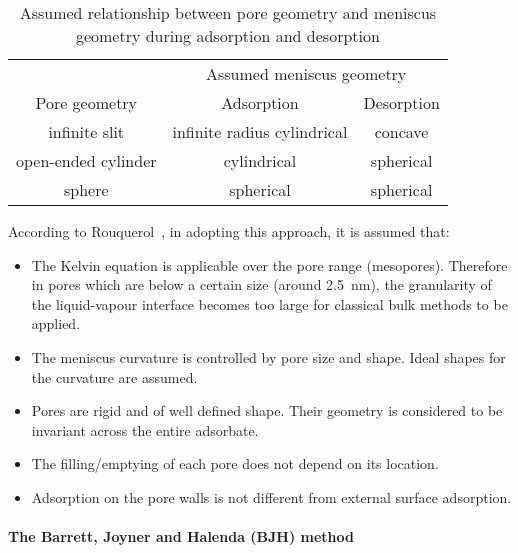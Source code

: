 \begin{table}[htb]
	\centering
	\caption{Assumed relationship between pore geometry and meniscus geometry during adsorption and desorption}%
	\label{pyg:tbl:kelvin-meniscus}
	\begin{tabular}{ccc}
		\toprule
		                    & \multicolumn{2}{c}{Assumed meniscus geometry}              \\
		\cmidrule{2-3}
		Pore geometry       & Adsorption                                    & Desorption \\
		\midrule
		infinite slit       & infinite radius cylindrical                   & concave    \\
		open-ended cylinder & cylindrical                                   & spherical  \\
		sphere              & spherical                                     & spherical  \\
		\bottomrule
	\end{tabular}
\end{table}

According to Rouquerol~\cite{rouquerolAdsorptionPowdersPorous2013},
in adopting this approach, it is assumed that:

\begin{itemize}

	\item The Kelvin equation is applicable over the pore
	      range (mesopores). Therefore in pores which are below a
	      certain size (around \SI{2.5}{\nano\meter}), the granularity
	      of the liquid-vapour interface becomes too large for classical
	      bulk methods to be applied.
	\item The meniscus curvature is controlled by pore size and
	      shape. Ideal shapes for the curvature are assumed.
	\item Pores are rigid and of well defined shape. Their geometry is
	      considered to be invariant across the entire adsorbate.
	\item The filling/emptying of each pore does not depend on its location.
	\item Adsorption on the pore walls is not different from
	      external surface adsorption.

\end{itemize}

\paragraph{The Barrett, Joyner and Halenda (BJH) method}


